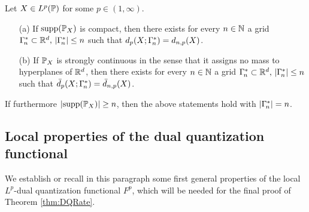 \begin{thm}\label{thm:existence}
Let $X \in L^p(\mathbb{P})$ for some $p \in (1,\infty)$. %
\begin{enumerate}
  \item[(a)] If $\operatorname{supp}(\mathbb{P}_X)$ is compact, then  there
  exists for every $n\in \mathbb{N}$ a grid $\Gamma_{\!n}^{\ast} \subset \mathbb{R}^d,\,
  \lvert\Gamma_{\!n}^{\ast}\rvert\leq n$ such that $d_p(X;\Gamma_{\!n}^{\ast}) = d_{n,p}(X)$.
  \item[(b)] If $\mathbb{P}_X$ is strongly continuous in the sense that it assigns 
  no mass  to  hyperplanes of $\mathbb{R}^d$, then  there exists for every $n\in \mathbb{N}$
  a grid $\Gamma_{\!n}^{\ast} \subset \mathbb{R}^d,\, \lvert\Gamma_{\!n}^{\ast}\rvert\leq n$ such that
$\bar d_p(X;\Gamma_{\!n}^{\ast}) = \bar d_{n,p}(X)$.
\end{enumerate}
If furthermore $\lvert\operatorname{supp}(\mathbb{P}_X)\rvert\geq n$, then the above statements hold with
$\lvert\Gamma_{\!n}^{\ast}\rvert= n$.
\end{thm}



\subsection{Local properties of the dual quantization functional}\label{sec:localProperties}

We establish or recall  in this paragraph some first general properties of the local $L^p$-dual
quantization functional $F^p$, which will be needed for the final proof of
Theorem \ref{thm:DQRate}.

